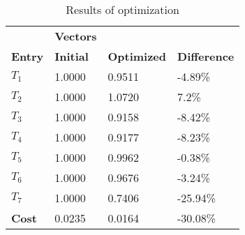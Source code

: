 \begin{table}[H]
\centering
\begin{tabular}{llll}
\textbf{}      & \cellcolor[HTML]{EFEFEF}\textbf{Vectors} & \textbf{} & \textbf{}         \\
\rowcolor[HTML]{EFEFEF} 
\textbf{Entry} & \textbf{Initial} & \textbf{Optimized} & \textbf{Difference} \\
$T_1$ & 1.0000 & 0.9511 & -4.89\% \\ 
$T_2$ & 1.0000 & 1.0720 & 7.2\% \\ 
$T_3$ & 1.0000 & 0.9158 & -8.42\% \\ 
$T_4$ & 1.0000 & 0.9177 & -8.23\% \\ 
$T_5$ & 1.0000 & 0.9962 & -0.38\% \\ 
$T_6$ & 1.0000 & 0.9676 & -3.24\% \\ 
$T_7$ & 1.0000 & 0.7406 & -25.94\% \\ 
\rowcolor[HTML]{EFEFEF} 
\textbf{Cost}  & 0.0235 & 0.0164 & -30.08\% \\ 
\end{tabular}
\caption{Results of optimization}
\label{tab:OptimizationAnalysis}
\end{table}